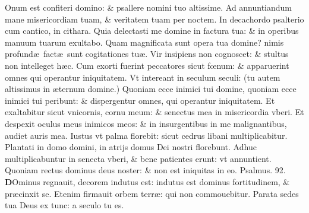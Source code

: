 \documentclass[a5paper,10pt]{book}
\def\ae{æ}
\def\oe{œ}
\begin{document}
\begin{multicols*}{2}
Onum est confiteri domino: \& psallere nomini tuo altissime.
\newline \color{red} A\color{black}d annuntiandum mane misericordiam tuam, \& veritatem tuam per noctem.
\newline \color{red} I\color{black}n decachordo psalterio cum cantico, in cithara.
\newline \color{red} Q\color{black}uia delectasti me domine in factura tua: \& in operibus manuum tuarum exultabo.
\newline \color{red} Q\color{black}uam magnificata sunt opera tua domine? nimis profund\ae \ fact\ae \ sunt cogitationes tu\ae .
\newline \color{red} V\color{black}ir insipiens non cognoscet: \& stultus non intelleget h\ae c.
\newline \color{red} C\color{black}um exorti fuerint peccatores sicut f\oe num: \& apparuerint omnes qui operantur iniquitatem.
\newline \color{red} V\color{black}t intereant in seculum seculi: (tu autem altissimus in \ae ternum domine.)
\newline \color{red} Q\color{black}uoniam ecce inimici tui domine, quoniam ecce inimici tui peribunt: \& dispergentur omnes, qui operantur iniquitatem.
\newline \color{red} E\color{black}t exaltabitur sicut vnicornis, cornu meum: \& senectus mea in misericordia vberi.
\newline \color{red} E\color{black}t despexit oculus meus inimicos meos: \& in insurgentibus in me malignantibus, audiet auris mea.
\newline \color{red} I\color{black}ustus vt palma florebit: sicut cedrus libani multiplicabitur.
\newline \color{red} P\color{black}lantati in domo domini, in atrijs domus Dei nostri florebunt.
\newline \color{red} A\color{black}dhuc multiplicabuntur in senecta vberi, \& bene patientes erunt: vt annuntient.
\newline \color{red} Q\color{black}uoniam rectus dominus deus noster: \& non est iniquitas in eo. \color{red} Psalmus. 92. \color{black}
\vspace{-1.25em}
\lettrine[lines=2]{\bfseries \color{red} D}{}Ominus regnauit, decorem indutus est: indutus est dominus fortitudinem, \& pr\ae cinxit se.
\newline \color{red} E\color{black}tenim firmauit orbem terr\ae : qui non commouebitur.
\newline \color{red} P\color{black}arata sedes tua Deus ex tunc: a seculo tu es.%

\end{multicols*}
\end{document}
